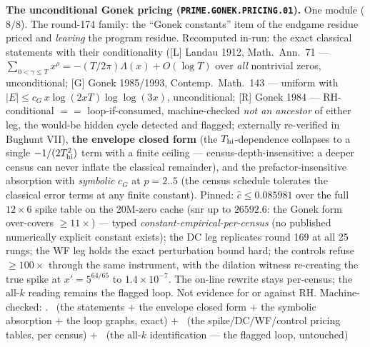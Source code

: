 \par\smallskip\noindent\textbf{The unconditional Gonek pricing
(\texttt{PRIME.\allowbreak GONEK.\allowbreak PRICING.01}).}
One module ($8/8$).  The round-174 family: the ``Gonek
constants'' item of the endgame residue priced and \emph{leaving}
the program residue.  Recomputed in-run: the exact classical
statements with their conditionality ([L] Landau 1912, Math.\
Ann.\ 71 --- $\sum_{0 < \gamma \le T} x^{\rho} = -(T/2\pi)
\Lambda(x) + O(\log T)$ over \emph{all} nontrivial zeros,
unconditional; [G] Gonek 1985/1993, Contemp.\ Math.\ 143 ---
uniform with $|E| \le c_G\,x \log(2xT) \log\log(3x)$,
unconditional; [R] Gonek 1984 --- RH-conditional $==$
loop-if-consumed, machine-checked \emph{not an ancestor} of
either leg, the would-be hidden cycle detected and flagged;
externally re-verified in Bughunt VII), \textbf{the envelope
closed form} (the $T_{\rm hi}$-dependence collapses to a single
$-1/(2T_{\rm hi}^2)$ term with a finite ceiling ---
census-depth-insensitive: a deeper census can never inflate the
classical remainder), and the prefactor-insensitive absorption
with \emph{symbolic} $c_G$ at $p = 2..5$ (the census schedule
tolerates the classical error terms at any finite constant).
Pinned: $\hat c \le 0.085981$ over the full $12 \times 6$ spike
table on the 20M-zero cache (snr up to $26592.6$: the Gonek form
over-covers $\ge 11\times$) --- typed
\emph{constant-empirical-per-census} (no published numerically
explicit constant exists); the DC leg replicates round 169 at
all 25 rungs; the WF leg holds the exact perturbation bound
hard; the controls refuse $\ge 100\times$ through the same
instrument, with the dilation witness re-creating the true spike
at $x' = 5^{64/65}$ to $1.4\times10^{-7}$.  The on-line rewrite
stays per-census; the all-$k$ reading remains the flagged loop.
Not evidence for or against RH.
Machine-checked:
.
\mE\ (the statements $+$ the envelope closed form $+$ the
symbolic absorption $+$ the loop graphs, exact) $+$ \mC\ (the
spike/DC/WF/control pricing tables, per census) $+$ \mO\ (the
all-$k$ identification --- the flagged loop, untouched)
\par\smallskip


